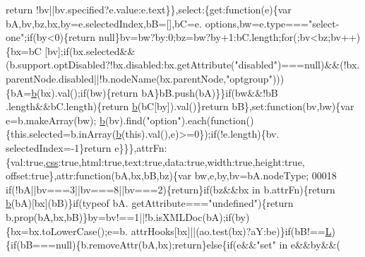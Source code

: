 \begin{DoxyCode}
{      return} !bv||bv.specified?e.value:e.text\}\},select:\{\textcolor{keyword}{get}:\textcolor{keyword}{function}(e)\{var bA,bv,bz,bx,by=e.selectedIndex,bB=[],bC=e.
      options,bw=e.type===\textcolor{stringliteral}{"select-one"};\textcolor{keywordflow}{if}(by<0)\{\textcolor{keywordflow}{return} null\}bv=bw?by:0;bz=bw?by+1:bC.length;\textcolor{keywordflow}{for}(;bv<bz;bv++)\{bx=bC
      [bv];\textcolor{keywordflow}{if}(bx.selected&&(b.support.optDisabled?!bx.disabled:bx.getAttribute(\textcolor{stringliteral}{"disabled"})===null)&&(!bx.
      parentNode.disabled||!b.nodeName(bx.parentNode,\textcolor{stringliteral}{"optgroup"})))\{bA=\hyperlink{jquery_8js_aa4026ad5544b958e54ce5e106fa1c805}{b}(bx).val();\textcolor{keywordflow}{if}(bw)\{\textcolor{keywordflow}{return} bA\}bB.push(bA)\}\}\textcolor{keywordflow}{if}(bw&&!bB
      .length&&bC.length)\{\textcolor{keywordflow}{return} \hyperlink{jquery_8js_aa4026ad5544b958e54ce5e106fa1c805}{b}(bC[by]).val()\}\textcolor{keywordflow}{return} bB\},set:\textcolor{keyword}{function}(bv,bw)\{var e=b.makeArray(bw);
      \hyperlink{jquery_8js_aa4026ad5544b958e54ce5e106fa1c805}{b}(bv).find(\textcolor{stringliteral}{"option"}).each(\textcolor{keyword}{function}()\{this.selected=b.inArray(\hyperlink{jquery_8js_aa4026ad5544b958e54ce5e106fa1c805}{b}(\textcolor{keyword}{this}).val(),e)>=0\});\textcolor{keywordflow}{if}(!e.length)\{bv.
      selectedIndex=-1\}\textcolor{keywordflow}{return} e\}\}\},attrFn:\{val:\textcolor{keyword}{true},\hyperlink{jquery_8js_a89ad527fcd82c01ebb587332f5b4fcd4}{css}:\textcolor{keyword}{true},html:\textcolor{keyword}{true},text:\textcolor{keyword}{true},data:\textcolor{keyword}{true},width:\textcolor{keyword}{true},height:\textcolor{keyword}{true},
      offset:\textcolor{keyword}{true}\},attr:\textcolor{keyword}{function}(bA,bx,bB,bz)\{var bw,e,by,bv=bA.nodeType;
00018 \textcolor{keywordflow}{if}(!bA||bv===3||bv===8||bv===2)\{\textcolor{keywordflow}{return}\}\textcolor{keywordflow}{if}(bz&&bx in b.attrFn)\{\textcolor{keywordflow}{return} \hyperlink{jquery_8js_aa4026ad5544b958e54ce5e106fa1c805}{b}(bA)[bx](bB)\}\textcolor{keywordflow}{if}(typeof bA.
      getAttribute===\textcolor{stringliteral}{"undefined"})\{\textcolor{keywordflow}{return} b.prop(bA,bx,bB)\}by=bv!==1||!b.isXMLDoc(bA);\textcolor{keywordflow}{if}(by)\{bx=bx.toLowerCase();e=b.
      attrHooks[bx]||(ao.test(bx)?aY:be)\}\textcolor{keywordflow}{if}(bB!==\hyperlink{jquery_8js_a38ee4c0b5f4fe2a18d0c783af540d253}{L})\{\textcolor{keywordflow}{if}(bB===null)\{b.removeAttr(bA,bx);\textcolor{keywordflow}{return}\}\textcolor{keywordflow}{else}\{\textcolor{keywordflow}{if}(e&&\textcolor{stringliteral}{"set"} in e&&by&&(

\end{DoxyCode}
